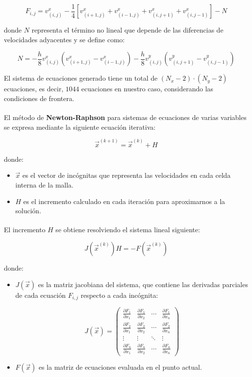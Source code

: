 \documentclass{article}
\begin{document}
  \[
  F_{i,j} = v_{(i,j)}^x - \frac{1}{4} \left[v_{(i+1,j)}^x + v_{(i-1,j)}^x + v_{(i,j+1)}^x + v_{(i,j-1)}^x \right] - N
  \]

  donde \(N\) representa el término no lineal que depende de las diferencias de velocidades adyacentes y se define como:

  \[
  N = -\frac{h}{8}v_{(i,j)}^x \left(v_{(i+1,j)}^x - v_{(i-1,j)}^x \right) - \frac{h}{8}v_{(i,j)}^y \left(v_{(i,j+1)}^y - v_{(i,j-1)}^y \right)
  \]

  El sistema de ecuaciones generado tiene un total de \((N_x - 2) \cdot (N_y - 2)\) ecuaciones, es decir, \(1044\) ecuaciones en nuestro caso, considerando las condiciones de frontera.

  \paragraph{}
  El método de \textbf{Newton-Raphson} para sistemas de ecuaciones de varias variables se expresa mediante la siguiente ecuación iterativa:

  \[
  \vec{x}^{(k+1)} = \vec{x}^{(k)} + H
  \]

  donde:
  \begin{itemize}
    \item \(\vec{x}\) es el vector de incógnitas que representa las velocidades en cada celda interna de la malla.
    \item \(H\) es el incremento calculado en cada iteración para aproximarnos a la solución.
  \end{itemize}

  \paragraph{}
  El incremento \(H\) se obtiene resolviendo el sistema lineal siguiente:

  \[
  J(\vec{x}^{(k)}) H = -F(\vec{x}^{(k)})
  \]

  donde:
  \begin{itemize}
    \item \(J(\vec{x})\) es la matriz jacobiana del sistema, que contiene las derivadas parciales de cada ecuación \(F_{i,j}\) respecto a cada incógnita:
      
    \[
    J(\vec{x}) = 
    \begin{pmatrix} 
    \frac{\partial F_1}{\partial x_1} & \frac{\partial F_1}{\partial x_2} & \cdots & \frac{\partial F_1}{\partial x_n} \\ 
    \frac{\partial F_2}{\partial x_1} & \frac{\partial F_2}{\partial x_2} & \cdots & \frac{\partial F_2}{\partial x_n} \\ 
    \vdots & \vdots & \ddots & \vdots \\ 
    \frac{\partial F_n}{\partial x_1} & \frac{\partial F_n}{\partial x_2} & \cdots & \frac{\partial F_n}{\partial x_n}
    \end{pmatrix}
    \]

    \item \(F(\vec{x})\) es la matriz de ecuaciones evaluada en el punto actual.
  \end{itemize}
\end{document}
